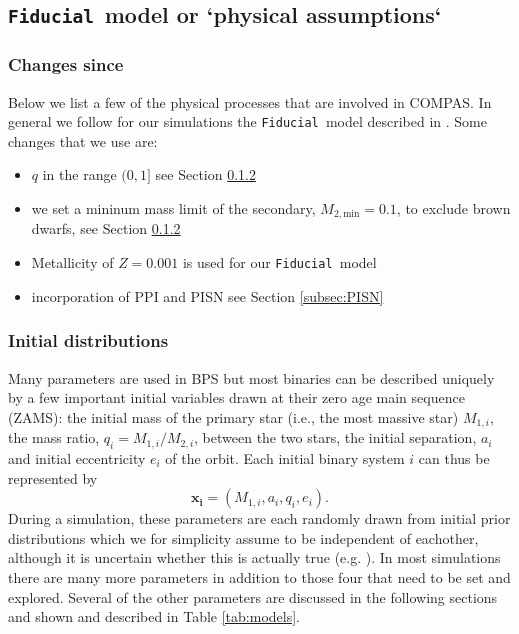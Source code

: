 \documentclass[a4paper,fleqn,usenatbib]{mnras}
\newcommand{\floor}[1]{\textbf{\textcolor{ochre}{#1}}}
\newcommand\Fiducial{\texttt{Fiducial }}
\begin{document}
\subsection{\Fiducial model \floor{or `physical assumptions`}}
\label{subsec:PhysicalAssumptions}


\subsubsection{Changes since \citep{vigna2018formation}}
Below we list a few of the physical processes that are involved in COMPAS. 
In general we follow for our simulations the \Fiducial model described in \citep{vigna2018formation}. Some changes that we use are:

\begin{itemize}
	\item $q$ in the range $(0,1]$  see Section \ref{subsec:initialDistributions}
	\item we set a mininum mass limit of the secondary,  $ M_{2,\text{min}} = 0.1$, to exclude brown dwarfs, see Section \ref{subsec:initialDistributions}
	\item Metallicity of $ Z = 0.001$ is used for our \Fiducial model
	\item incorporation of PPI and PISN see Section \ref{subsec:PISN}
\end{itemize}


\subsubsection{Initial distributions}
\label{subsec:initialDistributions}

Many parameters are used in BPS but most binaries can be described uniquely by a few important initial variables drawn at their zero age main sequence (ZAMS): the initial mass of the primary star (i.e., the most massive star) $M_{1,i}$, the mass ratio, $q_i = M_{1,i} / M_{2,i}$, between
the two stars, the initial separation, $a_i$ and initial eccentricity $e_i$ of the orbit. Each initial binary system $i$ can thus be represented by
\begin{equation}
	\mathbf{x_i} = (M_{1,i}, a_i, q_i, e_i). %
\end{equation}
%
%
During a simulation, these parameters are each randomly drawn from initial prior distributions which we for simplicity assume to be independent of eachother, although it is uncertain whether this is actually true (e.g.  \citealt{moe2017mind}). 
In most simulations there are many more parameters in addition to those four that need to be set and explored. Several of the other parameters are discussed in the following sections and shown and described in Table \ref{tab:models}.
\end{document}

